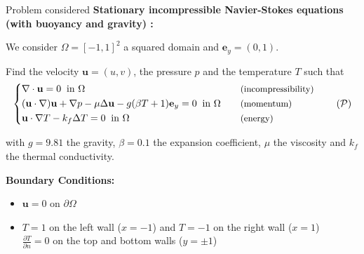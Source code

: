 \begin{frame}{Problem considered}
	\textbf{Stationary incompressible Navier-Stokes equations (with buoyancy and gravity) :}

	We consider $\Omega = [-1,1]^2$ a squared domain and $\mathbf{e}_y = (0,1)$.
	
	Find the velocity $\mathbf{u}=(u,v)$, the pressure $p$ and the temperature $T$ such that
	\begin{equation} \label{eq:Pb}
		\left\{\begin{aligned}
			&\nabla \cdot \mathbf{u} = 0 \;\; \text{in } \Omega \quad &&\text{\small (incompressibility)} \\
			&(\mathbf{u} \cdot \nabla)\mathbf{u} + \nabla p - \mu \Delta \mathbf{u} - g (\beta T + 1)\mathbf{e}_y = 0 \;\; \text{in } \Omega \quad &&\text{\small (momentum)} \\
			&\mathbf{u} \cdot \nabla T - k_f \Delta T = 0 \;\; \text{in } \Omega \quad &&\text{\small (energy)}
		\end{aligned}\right.
		\tag{$\mathcal{P}$}
	\end{equation}
	
	with $g=9.81$ the gravity, $\beta=0.1$ the expansion coefficient, $\mu$ the viscosity and $k_f$ the thermal conductivity. \citep{coulaud_investigations_2024}

	\vspace{5pt}

	\textbf{Boundary Conditions:} 

	\begin{itemize}
		\item $\mathbf{u} = 0$ on $\partial\Omega$
		\item $T = 1$ on the left wall ($x=-1$) and $T = -1$ on the right wall ($x=1$) \\
		$\displaystyle \frac{\partial T}{\partial n} = 0$ on the top and bottom walls ($y=\pm 1$)	
	\end{itemize}

\end{frame}

